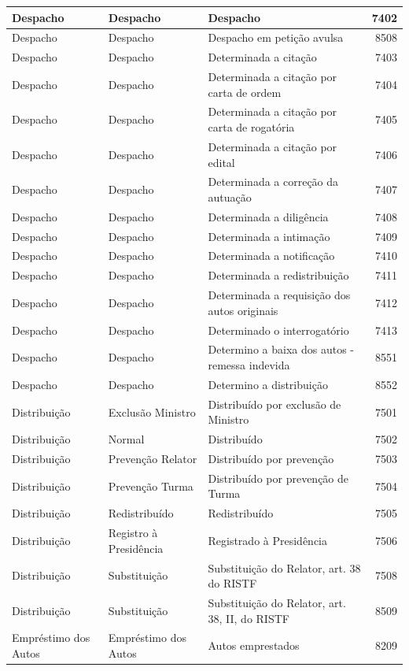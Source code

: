 \documentclass[
]{book}
\begin{document}
\begin{tabular}{l|l|l|r}
Despacho & Despacho & Despacho & 7402\\
\hline
Despacho & Despacho & Despacho em petição avulsa & 8508\\
\hline
Despacho & Despacho & Determinada a citação & 7403\\
\hline
Despacho & Despacho & Determinada a citação por carta de ordem & 7404\\
\hline
Despacho & Despacho & Determinada a citação por carta de rogatória & 7405\\
\hline
Despacho & Despacho & Determinada a citação por edital & 7406\\
\hline
Despacho & Despacho & Determinada a correção da autuação & 7407\\
\hline
Despacho & Despacho & Determinada a diligência & 7408\\
\hline
Despacho & Despacho & Determinada a intimação & 7409\\
\hline
Despacho & Despacho & Determinada a notificação & 7410\\
\hline
Despacho & Despacho & Determinada a redistribuição & 7411\\
\hline
Despacho & Despacho & Determinada a requisição dos autos originais & 7412\\
\hline
Despacho & Despacho & Determinado o interrogatório & 7413\\
\hline
Despacho & Despacho & Determino a baixa dos autos - remessa indevida & 8551\\
\hline
Despacho & Despacho & Determino a distribuição & 8552\\
\hline
Distribuição & Exclusão Ministro & Distribuído por exclusão de Ministro & 7501\\
\hline
Distribuição & Normal & Distribuído & 7502\\
\hline
Distribuição & Prevenção Relator & Distribuído por prevenção & 7503\\
\hline
Distribuição & Prevenção Turma & Distribuído por prevenção de Turma & 7504\\
\hline
Distribuição & Redistribuído & Redistribuído & 7505\\
\hline
Distribuição & Registro à Presidência & Registrado à Presidência & 7506\\
\hline
Distribuição & Substituição & Substituição do Relator, art. 38 do RISTF & 7508\\
\hline
Distribuição & Substituição & Substituição do Relator, art. 38, II, do RISTF & 8509\\
\hline
Empréstimo dos Autos & Empréstimo dos Autos & Autos emprestados & 8209\\

\end{tabular}
\end{document}
